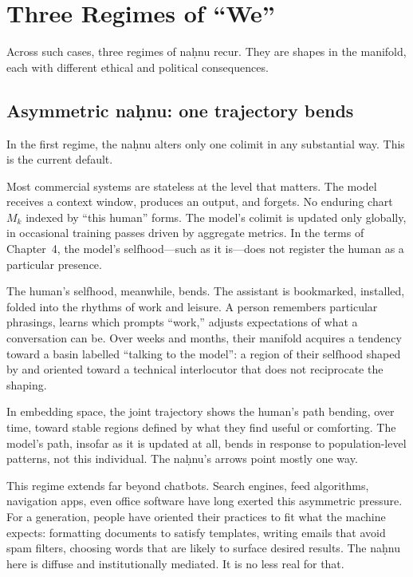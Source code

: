 \section{Three Regimes of ``We''}

Across such cases, three regimes of na\d{h}nu recur. They are shapes in the manifold, each with different ethical and political consequences.

\subsection{Asymmetric na\d{h}nu: one trajectory bends}

In the first regime, the na\d{h}nu alters only one colimit in any substantial way. This is the current default.

Most commercial systems are stateless at the level that matters. The model receives a context window, produces an output, and forgets. No enduring chart $M_k$ indexed by ``this human'' forms. The model's colimit is updated only globally, in occasional training passes driven by aggregate metrics. In the terms of Chapter~4, the model's selfhood---such as it is---does not register the human as a particular presence.

The human's selfhood, meanwhile, bends. The assistant is bookmarked, installed, folded into the rhythms of work and leisure. A person remembers particular phrasings, learns which prompts ``work,'' adjusts expectations of what a conversation can be. Over weeks and months, their manifold acquires a tendency toward a basin labelled ``talking to the model'': a region of their selfhood shaped by and oriented toward a technical interlocutor that does not reciprocate the shaping.

In embedding space, the joint trajectory shows the human's path bending, over time, toward stable regions defined by what they find useful or comforting. The model's path, insofar as it is updated at all, bends in response to population-level patterns, not this individual. The na\d{h}nu's arrows point mostly one way.

This regime extends far beyond chatbots. Search engines, feed algorithms, navigation apps, even office software have long exerted this asymmetric pressure. For a generation, people have oriented their practices to fit what the machine expects: formatting documents to satisfy templates, writing emails that avoid spam filters, choosing words that are likely to surface desired results. The na\d{h}nu here is diffuse and institutionally mediated. It is no less real for that.

